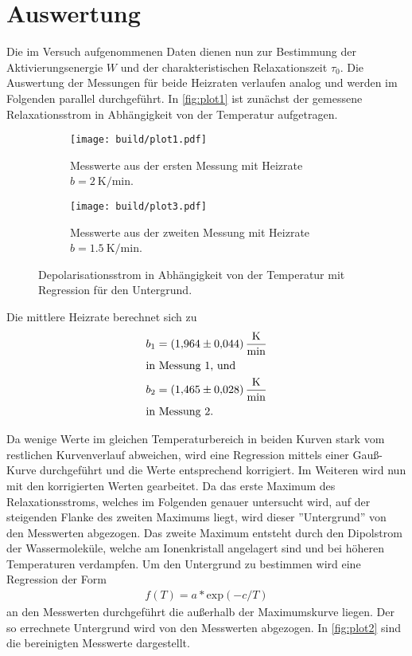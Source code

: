 \section{Auswertung}
\label{sec:Auswertung}

Die im Versuch aufgenommenen Daten dienen nun zur Bestimmung der Aktivierungsenergie $W$ und der charakteristischen Relaxationszeit $\tau_0$.
Die Auswertung der Messungen für beide Heizraten verlaufen analog und werden im Folgenden parallel durchgeführt.
In \autoref{fig:plot1} ist zunächst der gemessene Relaxationsstrom in Abhängigkeit von der Temperatur aufgetragen.

\begin{figure}[H]
  \begin{subfigure}{\textwidth}
  \centering
  \texttt{[image: build/plot1.pdf]}
  \caption{Messwerte aus der ersten Messung mit Heizrate $b=\qty{2}{\kelvin\per\minute}$.}
  \label{fig:plot1a}
  \end{subfigure}
  \hfill
  \begin{subfigure}{\textwidth}
  \centering
  \texttt{[image: build/plot3.pdf]}
  \caption{Messwerte aus der zweiten Messung mit Heizrate $b=\qty{1.5}{\kelvin\per\minute}$.}
  \label{fig:plot1b}
  \end{subfigure}
  \caption{Depolarisationsstrom in Abhängigkeit von der Temperatur mit Regression für den Untergrund.}
  \label{fig:plot1}
\end{figure}

Die mittlere Heizrate berechnet sich zu
\begin{align*}
  b_1&= \qty{1.964 \pm 0.044}{\kelvin\per\minute}\\
\intertext{in Messung 1, und}
  b_2 &= \qty{1.465 \pm 0.028}{\kelvin\per\minute}\\
\intertext{in Messung 2.}
\end{align*}

Da wenige Werte im gleichen Temperaturbereich in beiden Kurven stark vom restlichen Kurvenverlauf abweichen, wird eine Regression mittels
einer Gauß-Kurve durchgeführt und die Werte entsprechend korrigiert. Im Weiteren wird nun mit den korrigierten Werten gearbeitet.
Da das erste Maximum des Relaxationsstroms, welches im Folgenden genauer
untersucht wird, auf der steigenden Flanke des zweiten Maximums liegt, wird dieser
”Untergrund” von den Messwerten abgezogen.
Das zweite Maximum entsteht durch den Dipolstrom der Wassermoleküle, welche am Ionenkristall angelagert sind und bei höheren Temperaturen verdampfen.
Um den Untergrund zu bestimmen wird eine Regression der Form
\begin{align*}
  f(T)= a * \text{exp}(-c/T)
\end{align*}
an den Messwerten durchgeführt die außerhalb der Maximumskurve liegen.
Der so errechnete Untergrund wird von den Messwerten abgezogen.
In \autoref{fig:plot2} sind die bereinigten Messwerte dargestellt.

